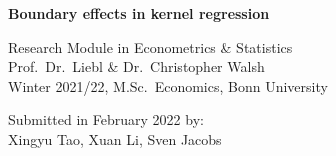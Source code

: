 \documentclass[a4paper, 12pt, bibliography=totoc]{scrartcl}
\theoremstyle{remark}
\begin{document}


\begin{titlepage}
	\vspace*{\fill}
	\begin{center}
		\LARGE
		\textsf{\textbf{Boundary effects in kernel regression}}  
		\vspace{2.5cm}
	 
		\large	
		Research Module in Econometrics \& Statistics \\  
		Prof.\ Dr.\ Liebl \& Dr.\ Christopher Walsh \\  
		Winter 2021/22, M.Sc.\ Economics, Bonn University
		\vspace{7.5cm}  
		
		Submitted in February 2022 by: \\
		Xingyu Tao, Xuan Li, Sven Jacobs  
	\end{center}
	\vspace*{\fill}
\end{titlepage}

\restoregeometry 
	
\newpage

\setcounter{page}{2}

\tableofcontents  

\newpage









\clearpage



\clearpage
 
\printbibliography  
\end{document}
